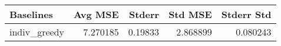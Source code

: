 \begin{tabular}{lrrrr}
\toprule
    Baselines &   Avg MSE &   Stderr &   Std MSE &  Stderr Std \\
\midrule
 indiv\_greedy &  7.270185 &  0.19833 &  2.868899 &    0.080243 \\
\bottomrule
\end{tabular}
